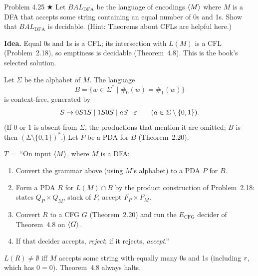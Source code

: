 \begin{question}{Problem 4.25 $\bigstar$}
Let $\mathit{BAL}_{\mathrm{DFA}}$ be the language of encodings $\langle M\rangle$ where $M$ is a DFA that accepts some string containing an equal number of 0s and 1s. Show that $\mathit{BAL}_{\mathrm{DFA}}$ is decidable. (Hint: Theorems about CFLs are helpful here.)
\end{question}
\begin{soln}
\textbf{Idea.} Equal 0s and 1s is a CFL; its intersection with $L(M)$ is a CFL (Problem~2.18), so emptiness is decidable (Theorem~4.8). This is the book's selected solution.

Let $\Sigma$ be the alphabet of $M$. The language
\[
B=\{w\in\Sigma^*\mid \#_0(w)=\#_1(w)\}
\]
is context-free, generated by
\[
S\to 0S1S \mid 1S0S \mid aS \mid \varepsilon
\qquad(a\in\Sigma\setminus\{0,1\}).
\]
(If $0$ or $1$ is absent from $\Sigma$, the productions that mention it are omitted; $B$ is then $(\Sigma\setminus\{0,1\})^*$.) Let $P$ be a PDA for $B$ (Theorem~2.20).

$T=$ ``On input $\langle M\rangle$, where $M$ is a DFA:
\begin{enumerate}
\item Convert the grammar above (using $M$'s alphabet) to a PDA $P$ for $B$.
\item Form a PDA $R$ for $L(M)\cap B$ by the product construction of Problem~2.18: states $Q_P\times Q_M$, stack of $P$, accept $F_P\times F_M$.
\item Convert $R$ to a CFG $G$ (Theorem~2.20) and run the $E_{\mathrm{CFG}}$ decider of Theorem~4.8 on $\langle G\rangle$.
\item If that decider accepts, \emph{reject}; if it rejects, \emph{accept}.''
\end{enumerate}
$L(R)\neq\emptyset$ iff $M$ accepts some string with equally many 0s and 1s (including $\varepsilon$, which has $0=0$). Theorem~4.8 always halts.
\end{soln}


